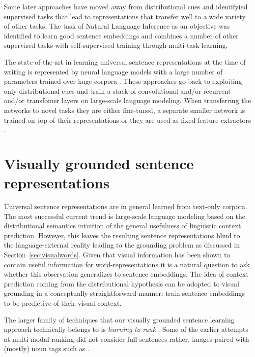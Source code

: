 Some later approaches have  moved away from distributional cues
and identifyied supervised tasks that lead to representations that transfer
well to a wide variety of other tasks. The task of Natural Language Inference \citep{bowman2015large,williams2017broad} as an objective
was identified to learn good sentence embeddings \citep{conneau-EtAl:2017:EMNLP2017,kiros2018inferlite}
and \cite{subramanian2018learning} combines a number of other supervised tasks
with self-supervised training through multi-task learning.


The state-of-the-art in learning universal sentence representations
at the time of writing is represented by neural language models
with a large number of parameters
trained over huge corpora \citep{peters2018deep,devlin2018bert}.
These approaches go back to
exploiting only distributional cues and train a stack of convolutional and/or recurrent
and/or transfomer layers on large-scale language modeling.
When transferring the networks to novel tasks they are either fine-tuned, a
separate smaller network is trained on top of their representations or they are used as
fixed feature extractors \citep{howard2018universal,peters2019tune}.

\section{Visually grounded sentence representations}
\label{sec:visualsentences}

Universal sentence representations are in general learned from text-only corpora. The most
successful current trend is large-scale language modeling based on
the distributional semantics intuition of the general usefulness of linguistic context prediction.
However, this leaves the resulting sentence representations blind to the language-external
reality leading to the grounding problem
as discussed in Section~\ref{sec:visualwords}. Given that visual information
has been shown to contain useful information for word-representations it
is a natural question to ask whether this observation generalizes to sentence
embeddings. The idea of context prediction coming from the distributional
hypothesis can be adopted to visual grounding in a conceptually straightforward manner:
train sentence embeddings to be predictive of their visual context.

The larger family of techniques that our visually grounded sentence learning
approach technically belongs to is \emph{learning to rank} \citep{li2011learning}.
Some of the earlier attempts at multi-modal ranking did not consider full sentences rather,
images paired with (mostly) noun tags such as \cite{weston2010large}.

